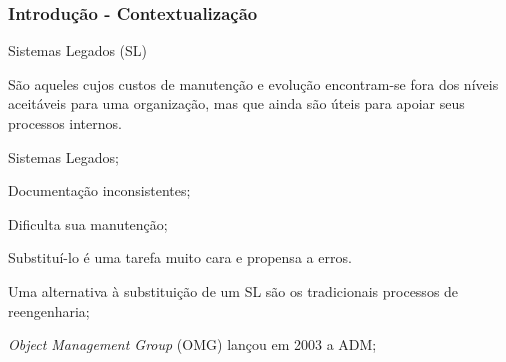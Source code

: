 \documentclass{beamer}
\begin{document}
\begin{frame}\frametitle{Introdução - Contextualização}

\begin{block}{Sistemas Legados (SL)}
\begin{minipage}[b]{10.80cm}
São aqueles cujos custos de manutenção e evolução encontram-se fora dos níveis aceitáveis para uma organização, mas que ainda são úteis para apoiar seus processos internos.
\end{minipage}  
\end{block}

\begin{itemize}
    \begin{minipage}[b]{9.8cm} \item Sistemas Legados; 
    \vspace{.2cm}
        \begin{itemize}
            \begin{minipage}[b]{9.8cm} \item Documentação inconsistentes; 
            \vspace{.2cm}
            \end{minipage}
            \begin{minipage}[b]{9.8cm} \item Dificulta sua manutenção; 
            \vspace{.2cm}
            \end{minipage}
            \begin{minipage}[b]{9.8cm} \item Substituí-lo é uma tarefa muito cara e propensa a erros. 
            \vspace{.2cm}
            \end{minipage}
        \end{itemize}
    \end{minipage}
    \begin{minipage}[b]{9.8cm} \item Uma alternativa à substituição de um SL são os tradicionais processos de reengenharia; 
    \vspace{.2cm}
        \begin{itemize}
            \begin{minipage}[b]{9.8cm} \item \textit{Object Management Group} (OMG) lançou em 2003 a ADM; 
            \vspace{.2cm}
            \end{minipage}
        \end{itemize}
    \end{minipage}
\end{itemize}

\end{frame}
\end{document}
